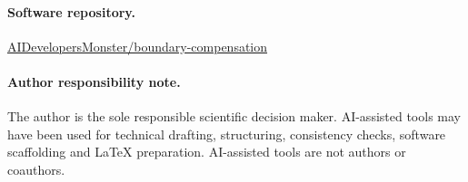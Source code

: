 \documentclass[11pt]{article}
\begin{document}
\paragraph{Software repository.}
\href{https://github.com/AIDevelopersMonster/boundary-compensation}{AIDevelopersMonster/boundary-compensation}

\paragraph{Author responsibility note.}
The author is the sole responsible scientific decision maker.  AI-assisted tools may have been used for technical drafting, structuring, consistency checks, software scaffolding and LaTeX preparation.  AI-assisted tools are not authors or coauthors.

\tableofcontents









\end{document}
